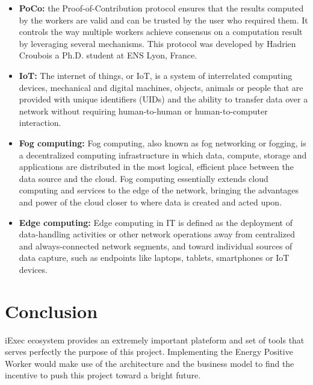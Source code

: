 \begin{itemize}
        \item \textbf{PoCo:} the Proof-of-Contribution protocol\cite{POCO} ensures that the results computed by the
        workers are valid and can be trusted by the user who required them. It controls the way multiple
        workers achieve consensus on a computation result by leveraging several mechanisms\cite{poco-definition}.
        This protocol was developed by Hadrien Croubois\cite{hadrien-croubois} a Ph.D. student at ENS Lyon, France.

        \item \textbf{IoT:} The internet of things, or IoT, is a system of interrelated computing devices,
        mechanical and digital machines, objects, animals or people that are provided with unique identifiers
        (UIDs) and the ability to transfer data over a network without requiring human-to-human or
        human-to-computer interaction\cite{IoT}.

        \item \textbf{Fog computing:} Fog computing, also known as fog networking or fogging, is a decentralized
        computing infrastructure in which data, compute, storage and applications are distributed in the most
        logical, efficient place between the data source and the cloud. Fog computing essentially extends cloud
        computing and services to the edge of the network, bringing the advantages and power of the cloud closer
        to where data is created and acted upon\cite{fog-computing}.

        \item \textbf{Edge computing:} Edge computing in IT is defined as the deployment of data-handling
        activities or other network operations away from centralized and always-connected network segments, and
        toward individual sources of data capture, such as endpoints like laptops, tablets, smartphones or IoT
        devices\cite{edge-computing}.
    \end{itemize}


\section{Conclusion}
    iExec ecosystem provides an extremely important plateform and set of tools that serves perfectly the purpose of
    this project. Implementing the Energy Positive Worker would make use of the architecture and the business
    model to find the incentive to push this project toward a bright future.